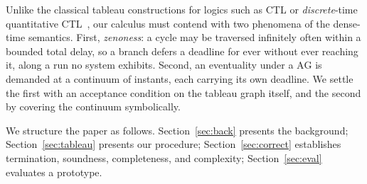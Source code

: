 Unlike the classical tableau constructions for logics such as CTL or
\emph{discrete}-time quantitative CTL~\cite{tableau_ctl,Clarke99,EmersonEtAl1992QuantitativeTemporalReasoning},
our calculus must contend with two phenomena of the {dense-time} semantics.
First, \emph{zenoness}: a cycle may be traversed infinitely often within a bounded
total delay, so a branch defers a deadline for ever without ever reaching it, along a
run no system exhibits. Second, an eventuality under a $\mathrm{AG}$ is demanded
at a continuum of instants, each carrying its own deadline. We settle the first with an
acceptance condition on the tableau graph itself, and the second by covering the continuum symbolically.

We structure the paper as follows.  Section~\ref{sec:back} presents the background; Section~\ref{sec:tableau} presents our procedure; Section~\ref{sec:correct} establishes
termination, soundness, completeness, and complexity; Section~\ref{sec:eval} evaluates a prototype.




%
%
%
%
%
%


